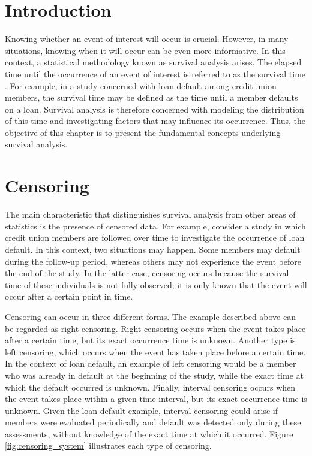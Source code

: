 \section{Introduction}

Knowing whether an event of interest will occur is crucial. However, in many situations, knowing when
it will occur can be even more informative. In this context, a statistical methodology known as survival
analysis arises. The elapsed time until the occurrence of an event of interest is referred to as the
survival time \cite{aalen2008survival}. For example, in a study concerned with loan default among credit
union members, the survival time may be defined as the time until a member defaults on a loan. Survival
analysis is therefore concerned with modeling the distribution of this time and investigating factors that
may influence its occurrence. Thus, the objective of this chapter is to present the fundamental
concepts underlying survival analysis.


\section{Censoring}

The main characteristic that distinguishes survival analysis from other areas of statistics is the presence
of censored data. For example, consider a study in which credit union members are followed over time to
investigate the occurrence of loan default. In this context, two situations may happen. Some members may
default during the follow-up period, whereas others may not experience the event before the end of the
study. In the latter case, censoring occurs because the survival time of these individuals is not fully
observed; it is only known that the event will occur after a certain point in time.

Censoring can occur in three different forms. The example described above can be regarded as right
censoring. Right censoring occurs when the event takes place after a certain time, but its exact occurrence
time is unknown. Another type is left censoring, which occurs when the event has taken place before a
certain time. In the context of loan default, an example of left censoring would be a member who was
already in default at the beginning of the study, while the exact time at which the default occurred is
unknown. Finally, interval censoring occurs when the event takes place within a given time interval, but
its exact occurrence time is unknown. Given the loan default example, interval censoring could arise if
members were evaluated periodically and default was detected only during these assessments, without
knowledge of the exact time at which it occurred. Figure \ref{fig:censoring_system} illustrates each type
of censoring.

